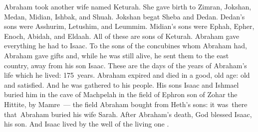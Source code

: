 
\begin{inparaenum}
   Abraham took another wife named Keturah.%
   She gave birth to Zimran, Jokshan, Medan, Midian, Ishbak, and Shuah.%
   Jokshan begat Sheba and Dedan. Dedan's sons were Asshurim, Letushim, and Leummim.%
   Midian's sons were Ephah, Epher, Enoch, Abidah, and Eldaah. All of these are sons of Keturah.%
   Abraham gave everything he had to Isaac.%
   To the sons of the concubines whom Abraham had, Abraham gave gifts and, while he was still alive, he sent them to the east country, away from his son Isaac.%
   These are the days of the years of Abraham's life which he lived: 175~years.%
   Abraham expired and died in a good, old age: old and satisfied. And he was gathered to his people.%
   His sons Isaac and Ishmael buried him in the cave of Machpelah in the field of Ephron son of Zohar the Hittite, by Mamre~---%
   the field Abraham bought from Heth's sons: it was\understood\ there that\understood\ Abraham buried his wife Sarah.%
   After Abraham's death, God blessed Isaac, his son. And Isaac lived by the well of the living one .%
  

\end{inparaenum}
